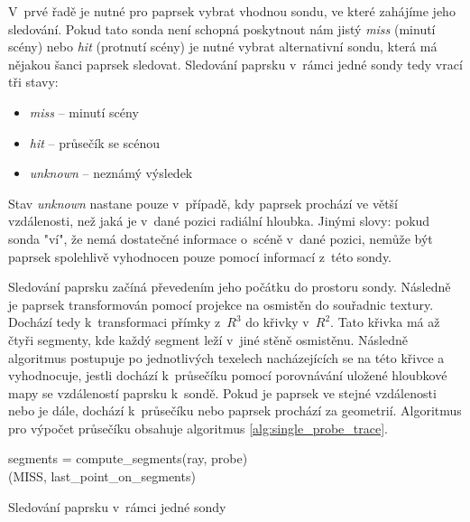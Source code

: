 V~prvé řadě je nutné pro paprsek vybrat vhodnou sondu, ve které zahájíme jeho sledování. Pokud tato sonda není schopná poskytnout nám jistý \textit{miss} (minutí scény) nebo \textit{hit} (protnutí scény) je nutné vybrat alternativní sondu, která má nějakou šanci paprsek sledovat. Sledování paprsku v~rámci jedné sondy tedy vrací tři stavy:
\begin{itemize}
    \item \textit{miss} -- minutí scény
    \item \textit{hit} -- průsečík se scénou
    \item \textit{unknown} -- neznámý výsledek
\end{itemize}

Stav \textit{unknown} nastane pouze v~případě, kdy paprsek prochází ve větší vzdálenosti, než jaká je v~dané pozici radiální hloubka. Jinými slovy: pokud sonda "ví", že nemá dostatečné informace o~scéně v~dané pozici, nemůže být paprsek spolehlivě vyhodnocen pouze pomocí informací z~této sondy. 

Sledování paprsku začíná převedením jeho počátku do prostoru sondy. Následně je paprsek transformován pomocí projekce na osmistěn do souřadnic textury. Dochází tedy k~transformaci přímky z~$R^3$ do křivky v~$R^2$. Tato křivka má až čtyři segmenty, kde každý segment leží v~jiné stěně osmistěnu. Následně algoritmus postupuje po jednotlivých texelech nacházejících se na této křivce a vyhodnocuje, jestli dochází k~průsečíku pomocí porovnávání uložené hloubkové mapy se vzdáleností paprsku k~sondě. Pokud je paprsek ve stejné vzdálenosti nebo je dále, dochází k~průsečíku nebo paprsek prochází za geometrií. Algoritmus pro výpočet průsečíku obsahuje algoritmus \ref{alg:single_probe_trace}. 

\begin{center}
	\begin{czechalgorithm}[H] \label{alg:single_probe_trace}
	    segments = compute\_segments(ray, probe)\\
	    \KwRet (MISS, last\_point\_on\_segments)
		\caption{Sledování paprsku v~rámci jedné sondy}
	\end{czechalgorithm}
\end{center}

